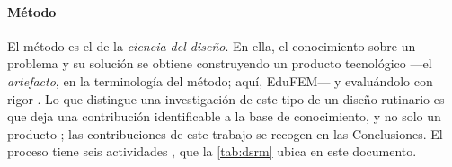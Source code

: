 \paragraph{Método} El método es el de la \emph{ciencia del diseño}. En ella, el conocimiento sobre un problema y su solución se obtiene construyendo un producto tecnológico —el \emph{artefacto}, en la terminología del método; aquí, EduFEM— y evaluándolo con rigor \autocite[pp.~75, 83]{hevner2004design}. Lo que distingue una investigación de este tipo de un diseño rutinario es que deja una contribución identificable a la base de conocimiento, y no solo un producto \autocite[p.~81]{hevner2004design}; las contribuciones de este trabajo se recogen en las Conclusiones. El proceso tiene seis actividades \autocite[pp.~52-56]{peffers2007dsrm}, que la \autoref{tab:dsrm} ubica en este documento.


